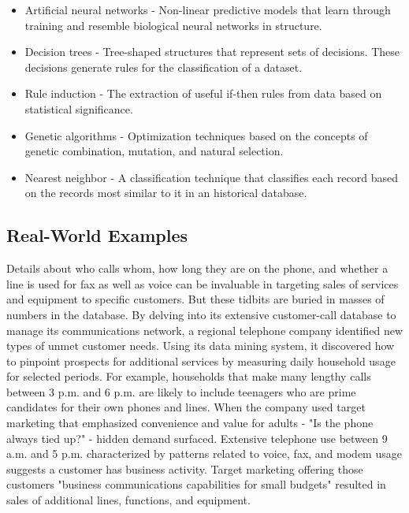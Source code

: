 \begin{itemize}
\item Artificial neural networks - Non-linear predictive models that learn through training and resemble biological neural networks in structure.

\item Decision trees - Tree-shaped structures that represent sets of decisions. These decisions generate rules for the classification of a dataset.

\item Rule induction - The extraction of useful if-then rules from data based on statistical significance.

\item Genetic algorithms - Optimization techniques based on the concepts of genetic combination, mutation, and natural selection.

\item Nearest neighbor - A classification technique that classifies each record based on the records most similar to it in an historical database.
\end{itemize}

\subsection{Real-World Examples}
Details about who calls whom, how long they are on the phone, and whether a line is used for fax as well as voice can be invaluable in targeting sales of services and equipment to specific customers. But these tidbits are buried in masses of numbers in the database. By delving into its extensive customer-call database to manage its communications network, a regional telephone company identified new types of unmet customer needs. Using its data mining system, it discovered how to pinpoint prospects for additional services by measuring daily household usage for selected periods. For example, households that make many lengthy calls between 3 p.m. and 6 p.m. are likely to include teenagers who are prime candidates for their own phones and lines. When the company used target marketing that emphasized convenience and value for adults - "Is the phone always tied up?" - hidden demand surfaced. Extensive telephone use between 9 a.m. and 5 p.m. characterized by patterns related to voice, fax, and modem usage suggests a customer has business activity. Target marketing offering those customers "business communications capabilities for small budgets" resulted in sales of additional lines, functions, and equipment.

